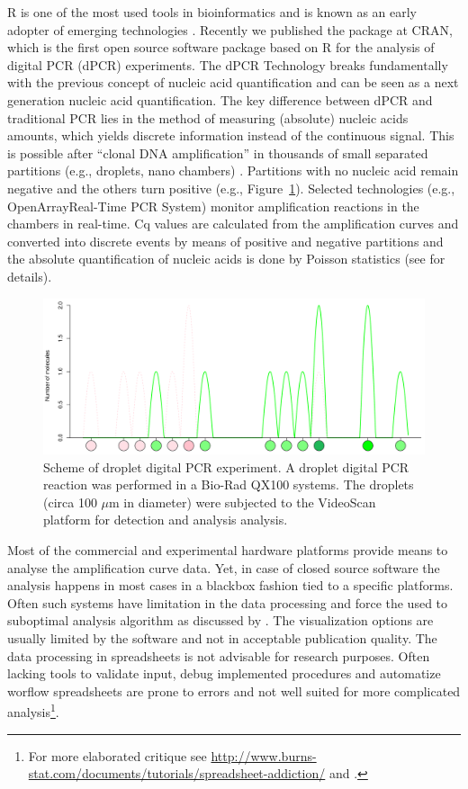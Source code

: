 R is one of the most used tools in bioinformatics and is known as an early 
adopter of emerging technologies \citep{pabinger_2014}. Recently we published 
the  package at CRAN, which is the first open source software 
package based on R for the analysis of digital PCR (dPCR) experiments. The dPCR 
Technology breaks fundamentally with the previous concept of nucleic acid 
quantification and can be seen as a next generation nucleic acid quantification. 
The key difference between dPCR and traditional PCR lies in the method of 
measuring (absolute) nucleic acids amounts, which yields discrete information 
instead of the continuous signal. This is possible after ``clonal DNA 
amplification'' in thousands of small separated partitions (e.g., droplets, nano 
chambers) \citep{huggett_2013, milbury_2014, morley_2014}. Partitions with no 
nucleic acid remain negative and the others turn positive (e.g., 
Figure~\ref{figure:dpcR_sim}). Selected technologies (e.g., 
OpenArray\textregistered Real-Time PCR System) monitor amplification reactions 
in the chambers in real-time. Cq values are calculated from the amplification 
curves and converted into discrete events by means of positive and negative 
partitions and the absolute quantification of nucleic acids is done by Poisson 
statistics (see  for details).

\begin{figure}[htbp]
  \centering
  \includegraphics[clip=true, width=12cm]{figures/dpcR_sim.png}
  \caption{Scheme of droplet digital PCR experiment.  A droplet 
digital PCR reaction was performed in a Bio-Rad QX100 systems.  The 
droplets (circa 100 $\mu$m in diameter) were subjected to the VideoScan platform 
for detection and analysis analysis.}
\label{figure:dpcR_sim}
\end{figure}

Most of the commercial and experimental hardware platforms provide means to 
analyse the amplification curve data. Yet, in case of closed source software the 
analysis happens in most cases in a blackbox fashion tied to a specific 
platforms. Often such systems have limitation in the data processing and force 
the used to suboptimal analysis algorithm as discussed by \citet{ruijter_2013}. 
The visualization options are usually limited by the software and not in 
acceptable publication quality. The data processing in spreadsheets is not advisable 
for research purposes. Often lacking tools to validate input, debug implemented procedures
and automatize worflow spreadsheets are prone to errors and not well suited for more
complicated analysis\footnote{For more elaborated critique see 
\url{http://www.burns-stat.com/documents/tutorials/spreadsheet-addiction/} 
and \citet{mccullough_2008}.}.

